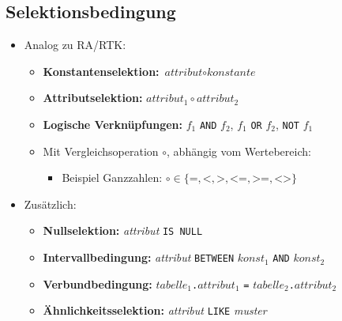         \subsection{Selektionsbedingung} %
            \begin{itemize}
            	\item Analog zu RA/RTK:
            		\begin{itemize}
            			\item \textbf{Konstantenselektion:} \( \textit{attribut} \circ \textit{konstante} \)
            			\item \textbf{Attributselektion:} \( \textit{attribut}_1 \circ \textit{attribut}_2 \)
            			\item \textbf{Logische Verknüpfungen:} \(f_1\) \lstinline|AND| \(f_2\), \(f_1\) \lstinline|OR| \(f_2\), \lstinline|NOT| \(f_1\)
            			\item Mit Vergleichsoperation \(\circ\), abhängig vom Wertebereich:
            				\begin{itemize}
            					\item Beispiel Ganzzahlen: \( \circ \in \{ \texttt{=}, \texttt{<}, \texttt{>}, \texttt{<=}, \texttt{>=}, \texttt{<>} \} \)
            				\end{itemize}
            		\end{itemize}
           		\item Zusätzlich:
           			\begin{itemize}
           				\item \textbf{Nullselektion:} \textit{attribut} \lstinline|IS NULL|
           				\item \textbf{Intervallbedingung:} \textit{attribut} \lstinline|BETWEEN| \(\textit{konst}_1\) \lstinline|AND| \(\textit{konst}_2\)
           				\item \textbf{Verbundbedingung:} \(\textit{tabelle}_1\)\lstinline|.|\(\textit{attribut}_1\) \lstinline|=| \(\textit{tabelle}_2\)\lstinline|.|\(\textit{attribut}_2\)
           				\item \textbf{Ähnlichkeitsselektion:} \textit{attribut} \lstinline|LIKE| \textit{muster}
           			\end{itemize}
            \end{itemize}

